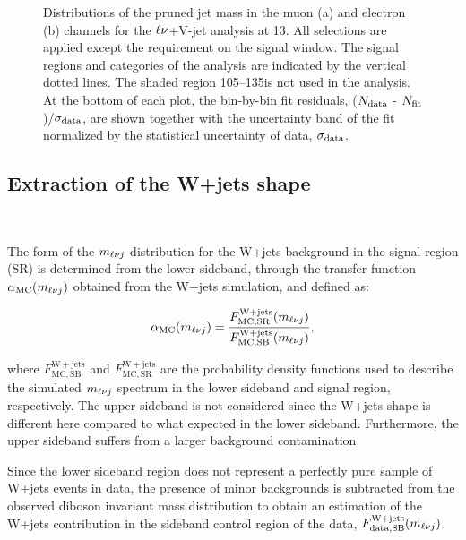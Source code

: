 \begin{figure}[!htb]
\centering     %
{}
\caption{Distributions of the pruned jet mass \mJ in the muon (a) and electron (b) channels for the $\ell\nu$+V-jet analysis at 13\TeV. All selections are applied except the requirement on the \mJ signal window. The signal regions and \mJ categories of the analysis are indicated by the vertical dotted lines. The shaded \mJ region 105--135\GeV is not used in the analysis. At the bottom of each plot, the bin-by-bin fit residuals, ($N_{\rm data}$ - $N_{\rm fit}$)/$\sigma_{\rm data}$, are shown together with the uncertainty band of the fit normalized by the statistical uncertainty of data, $\sigma_{\rm data}$.}
\label{fig:mjfit13TeV}
\end{figure}

\subsection{Extraction of the W+jets shape}~\label{subsec:wjetshape}

The form of the $m_{\ell\nu j}$ distribution for the W+jets background in the signal region (SR) is determined from the lower \mJ sideband, through the transfer function $\alpha_\mathrm{MC}(m_{\ell\nu j})$ obtained from the W+jets simulation, and defined as:

\begin{equation}
\alpha_\mathrm{MC}(m_{\ell\nu j}) = \frac{F_\mathrm{MC, SR}^{\mathrm{W+jets}}(m_{\ell\nu j})}{F_\mathrm{MC, SB}^{\mathrm{W+jets}}(m_{\ell\nu j})},
\end{equation}

where $F_\mathrm{MC, SB}^{\mathrm{W+jets}}$ and $F_\mathrm{MC, SR}^{\mathrm{W+jets}}$ are the probability density functions used to describe the simulated $m_{\ell\nu j}$ spectrum in the lower \mJ sideband and signal region, respectively.
The upper \mJ sideband is not considered since the W+jets shape is different here compared to what expected in the lower sideband. Furthermore, the upper sideband suffers from a larger \ttbar background contamination.

Since the lower sideband region does not represent a perfectly pure sample of W+jets events in data, the presence of minor backgrounds is subtracted from the observed diboson invariant mass distribution
to obtain an estimation of the W+jets contribution in the sideband control region of the data, $F_\mathrm{data, SB}^{\mathrm{W+jets}}(m_{\ell\nu j})$.

